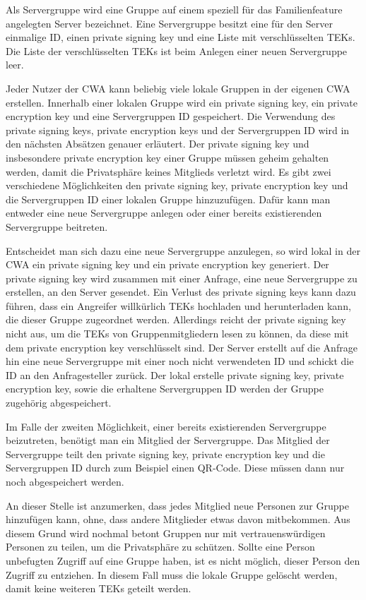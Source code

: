 \documentclass[conference]{IEEEtran}
\begin{document}
Als Servergruppe wird eine Gruppe auf einem speziell für das Familienfeature angelegten Server bezeichnet.
Eine Servergruppe besitzt eine für den Server einmalige ID, einen private signing key und eine Liste mit verschlüsselten TEKs.
Die Liste der verschlüsselten TEKs ist beim Anlegen einer neuen Servergruppe leer.

Jeder Nutzer der CWA kann beliebig viele lokale Gruppen in der eigenen CWA erstellen.
Innerhalb einer lokalen Gruppe wird ein private signing key, ein private encryption key und eine Servergruppen ID gespeichert.
Die Verwendung des private signing keys, private encryption keys und der Servergruppen ID wird in den nächsten Absätzen genauer erläutert.
Der private signing key und insbesondere private encryption key einer Gruppe müssen geheim gehalten werden, damit die Privatsphäre keines Mitglieds verletzt wird.
Es gibt zwei verschiedene Möglichkeiten den private signing key, private encryption key und die Servergruppen ID einer lokalen Gruppe hinzuzufügen.
Dafür kann man entweder eine neue Servergruppe anlegen oder einer bereits existierenden Servergruppe beitreten.

Entscheidet man sich dazu eine neue Servergruppe anzulegen, so wird lokal in der CWA ein private signing key und ein private encryption key generiert.
Der private signing key wird zusammen mit einer Anfrage, eine neue Servergruppe zu erstellen, an den Server gesendet.
Ein Verlust des private signing keys kann dazu führen, dass ein Angreifer willkürlich TEKs hochladen und herunterladen kann, die dieser Gruppe zugeordnet werden.
Allerdings reicht der private signing key nicht aus, um die TEKs von Gruppenmitgliedern lesen zu können, da diese mit dem private encryption key verschlüsselt sind.
Der Server erstellt auf die Anfrage hin eine neue Servergruppe mit einer noch nicht verwendeten ID und schickt die ID an den Anfragesteller zurück.
Der lokal erstelle private signing key, private encryption key, sowie die erhaltene Servergruppen ID werden der Gruppe zugehörig abgespeichert.

Im Falle der zweiten Möglichkeit, einer bereits existierenden Servergruppe beizutreten, benötigt man ein Mitglied der Servergruppe.
Das Mitglied der Servergruppe teilt den private signing key, private encryption key und die Servergruppen ID durch zum Beispiel einen QR-Code.
Diese müssen dann nur noch abgespeichert werden.

An dieser Stelle ist anzumerken, dass jedes Mitglied neue Personen zur Gruppe hinzufügen kann, ohne, dass andere Mitglieder etwas davon mitbekommen.
Aus diesem Grund wird nochmal betont Gruppen nur mit vertrauenswürdigen Personen zu teilen, um die Privatsphäre zu schützen.
Sollte eine Person unbefugten Zugriff auf eine Gruppe haben, ist es nicht möglich, dieser Person den Zugriff zu entziehen.
In diesem Fall muss die lokale Gruppe gelöscht werden, damit keine weiteren TEKs geteilt werden.
\end{document}
